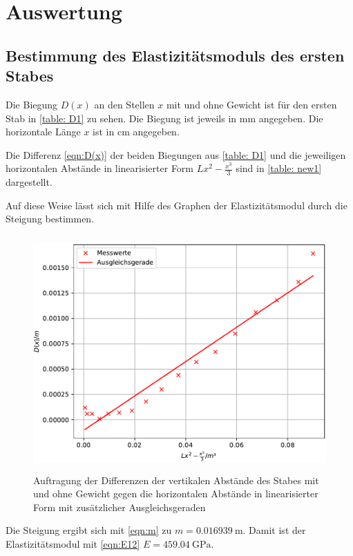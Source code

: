 \section{Auswertung}
\label{sec:Auswertung}

\subsection{Bestimmung des Elastizitätsmoduls des ersten Stabes}
Die Biegung $D(x)$ an den Stellen $x$ mit und ohne Gewicht
ist für den ersten Stab in \ref{table: D1} zu sehen. Die Biegung ist
jeweils in $\si{\mm}$ angegeben.
Die horizontale Länge $x$ ist in $\si{\cm}$ angegeben.

Die Differenz \eqref{eqn:D(x)} der beiden Biegungen aus \ref{table: D1} 
und die jeweiligen horizontalen Abstände in linearisierter Form $Lx^2-\frac{x^3}{3}$
sind in \ref{table: new1} dargestellt.

Auf diese Weise lässt sich mit Hilfe des Graphen %
der Elastizitätsmodul durch die Steigung bestimmen.
\begin{figure}
  \centering
  \includegraphics[width=12cm, height=9cm]{./plots/Stange1.pdf}
  \caption{Auftragung der Differenzen der vertikalen Abstände des Stabes mit und ohne Gewicht gegen die horizontalen Abstände in linearisierter Form mit zusätzlicher Ausgleichsgeraden}
  \label{fig:plot1}
\end{figure}
Die Steigung ergibt sich mit \eqref{eqn:m}
zu $m = \SI{0.016939}{\meter}$. Damit ist der Elastizitätsmodul mit \eqref{eqn:E12}%
$E = \SI{459.04}{\giga\pascal}$.

